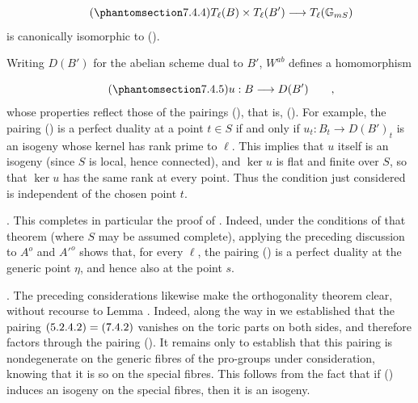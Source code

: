\begin{equation}\tag{\SGARefTarget{sga7.sga7i.eix.n7-4-4}{7.4.4}}
T_{\ell}(B) \times T_{\ell}(B')
 \longrightarrow T_{\ell}(\mathbb G_{mS})
\end{equation}
is canonically isomorphic to ().

Writing $D(B')$ for the abelian scheme dual to $B'$, $W^{ab}$ defines
a homomorphism

\begin{equation}\tag{\SGARefTarget{sga7.sga7i.eix.n7-4-5}{7.4.5}}
u:B\longrightarrow D(B') \qquad ,
\end{equation}
whose properties reflect those of the pairings (), that is,
(). For example, the pairing () is a perfect duality at a
point $t\in S$ if and only if
$u_t:B_t\longrightarrow D(B')_t$ is an isogeny whose kernel has rank
prime to $\ell$. This implies that $u$ itself is an isogeny (since
$S$ is local, hence connected), and $\ker u$ is flat and finite over
$S$, so that $\ker u$ has the same rank at every point. Thus the
condition just considered is independent of the chosen point $t$.

\medskip
\noindent
{}. This completes in particular the proof of . Indeed, under
the conditions of that theorem (where $S$ may be assumed complete),
applying the preceding discussion to $A^o$ and ${A'}^o$ shows that,
for every $\ell$, the pairing () is a perfect duality at the
generic point $\eta$, and hence also at the point $s$.

\medskip
\noindent
{}. The preceding considerations likewise make the orthogonality
theorem  clear, without recourse to Lemma . Indeed, along the
way in  we established that the pairing
$(\SGARefLink{sga7.sga7i.eix.n5-2-3-1}{5.2.4.2})=(\SGARefLink{sga7.sga7i.eix.n7-4-2}{7.4.2})$ vanishes on the toric parts on both sides, and
therefore factors through the pairing (). It remains only to
establish that this pairing is nondegenerate on the generic fibres of
the pro-groups under consideration, knowing that it is so on the
special fibres. This follows from the fact that if () induces an
isogeny on the special fibres, then it is an isogeny.

